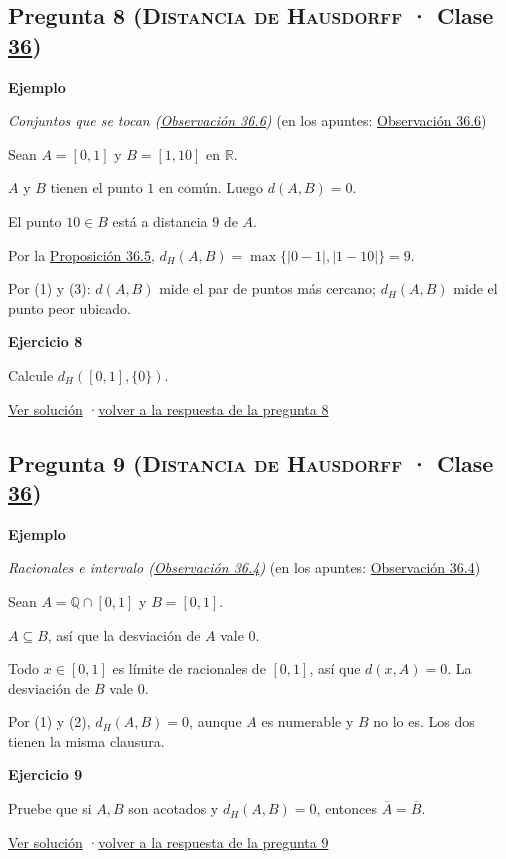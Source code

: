 \documentclass[11pt,a4paper]{article}
\newcommand{\R}{\mathbb{R}}\newcommand{\N}{\mathbb{N}}\newcommand{\Q}{\mathbb{Q}}
\newcommand{\cl}[1]{\overline{#1}}\newcommand{\norm}[1]{\lVert #1\rVert}\newcommand{\abs}[1]{\lvert #1\rvert}
\newcommand{\bloque}[1]{\par\smallskip\noindent\textbf{\color{acento}#1}\par}
\begin{document}
\subsection*{\hypertarget{e-8}{}Pregunta 8 \normalfont\small(\textsc{Distancia de Hausdorff} · Clase \href{https://decostruttivismo.github.io/MAT2514-repaso/pdf/MAT2514_apuntes_completos.pdf\#nameddest=section.36}{36})}
\bloque{Ejemplo}
\textit{Conjuntos que se tocan (\href{https://decostruttivismo.github.io/MAT2514-repaso/pdf/MAT2514_apuntes_completos.pdf\#nameddest=teorema.36.6}{Observación 36.6})} {\small(en los apuntes: \href{https://decostruttivismo.github.io/MAT2514-repaso/pdf/MAT2514_apuntes_completos.pdf\#nameddest=teorema.36.6}{Observación 36.6})}
\begin{pasos}
\item[] Sean $A=[0,1]$ y $B=[1,10]$ en $\R$.
\item[(1)] $A$ y $B$ tienen el punto $1$ en común. Luego $d(A,B)=0$.
\item[(2)] El punto $10\in B$ está a distancia $9$ de $A$.
\item[(3)] Por la \href{https://decostruttivismo.github.io/MAT2514-repaso/pdf/MAT2514_apuntes_completos.pdf\#nameddest=teorema.36.5}{Proposición 36.5}, $d_H(A,B)=\max\{\abs{0-1},\abs{1-10}\}=9$.
\item[] Por (1) y (3): $d(A,B)$ mide el par de puntos más cercano; $d_H(A,B)$ mide el punto peor ubicado.
\end{pasos}
\bloque{\hypertarget{x-8}{}Ejercicio 8}
Calcule $d_H([0,1],\{0\})$.
\par{\small \hyperlink{s-8}{Ver solución} \quad·\quad \hyperlink{r-8}{volver a la respuesta de la pregunta 8}}
\subsection*{\hypertarget{e-9}{}Pregunta 9 \normalfont\small(\textsc{Distancia de Hausdorff} · Clase \href{https://decostruttivismo.github.io/MAT2514-repaso/pdf/MAT2514_apuntes_completos.pdf\#nameddest=section.36}{36})}
\bloque{Ejemplo}
\textit{Racionales e intervalo (\href{https://decostruttivismo.github.io/MAT2514-repaso/pdf/MAT2514_apuntes_completos.pdf\#nameddest=teorema.36.4}{Observación 36.4})} {\small(en los apuntes: \href{https://decostruttivismo.github.io/MAT2514-repaso/pdf/MAT2514_apuntes_completos.pdf\#nameddest=teorema.36.4}{Observación 36.4})}
\begin{pasos}
\item[] Sean $A=\Q\cap[0,1]$ y $B=[0,1]$.
\item[(1)] $A\subseteq B$, así que la desviación de $A$ vale $0$.
\item[(2)] Todo $x\in[0,1]$ es límite de racionales de $[0,1]$, así que $d(x,A)=0$. La desviación de $B$ vale $0$.
\item[] Por (1) y (2), $d_H(A,B)=0$, aunque $A$ es numerable y $B$ no lo es. Los dos tienen la misma clausura.
\end{pasos}
\bloque{\hypertarget{x-9}{}Ejercicio 9}
Pruebe que si $A,B$ son acotados y $d_H(A,B)=0$, entonces $\cl A=\cl B$.
\par{\small \hyperlink{s-9}{Ver solución} \quad·\quad \hyperlink{r-9}{volver a la respuesta de la pregunta 9}}
\end{document}
